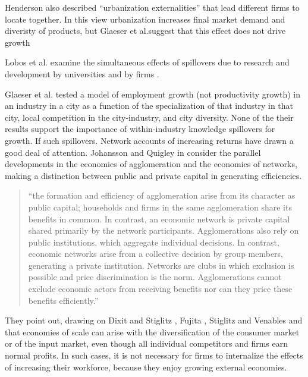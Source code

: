 



Henderson also described ``urbanization externalities'' that lead different firms to locate together. In this view urbanization increases final market demand and diveristy of products, but Glaeser et al.suggest that this effect does not drive growth

Lobos et al. examine the simultaneous effects of spillovers due to research and development by universities and by firms \cite{belderbosWhatSpilloversUniversities2022}.

Glaeser et al. \cite{glaeserGrowthCities1991} tested a model  of employment growth (not productivity growth) in an industry in a city as a function of the specialization of that industry in that city, local competition in the city-industry, and city diversity. None of the their results  support the importance
of within-industry knowledge spillovers for growth. If such spillovers. %
Network accounts of increasing returns have drawn a good deal of attention.
Johansson and Quigley \cite{johanssonAgglomerationNetworksSpatial} in \cite{floraxFiftyYearsRegional2004} consider the parallel developments in the economics of agglomeration and the economics of networks, making a distinction between public and private capital in generating efficiencies.

\begin{quotation}
``the formation and efficiency of agglomeration arise from its character as public capital; households and firms in the same agglomeration share its benefits in common. In contrast, an economic network is private capital shared primarily by the network participants. Agglomerations also rely on public institutions, which aggregate individual decisions. In contrast, economic networks arise from a collective decision by group members, generating a private institution. Networks are clubs in which exclusion is possible and price discrimination is the norm. Agglomerations cannot exclude economic actors from receiving benefits nor can they price these benefits efficiently.''
\end{quotation}
They point out, drawing on Dixit and Stiglitz \cite{AvinashK.Dixit1977MCaO},  Fujita \cite{fujitaMonopolisticCompetitionModel1988}, Stiglitz and Venables and \cite{fujitaSpatialEconomyCities1999} that economies of scale  can arise with the diversification of the consumer market or of the input market, even though all individual competitors and firms earn normal profits. In such cases, it is not necessary for firms to internalize the effects of increasing their workforce, because they enjoy growing external economies.

